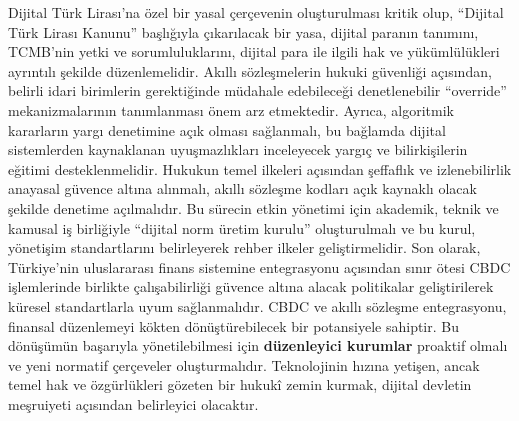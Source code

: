 \documentclass[a4paper,12pt]{article}
\begin{document}
Dijital Türk Lirası’na özel bir yasal çerçevenin oluşturulması kritik olup, “Dijital Türk Lirası Kanunu” başlığıyla çıkarılacak bir yasa, dijital paranın tanımını, TCMB’nin yetki ve sorumluluklarını, dijital para ile ilgili hak ve yükümlülükleri ayrıntılı şekilde düzenlemelidir. Akıllı sözleşmelerin hukuki güvenliği açısından, belirli idari birimlerin gerektiğinde müdahale edebileceği denetlenebilir “override” mekanizmalarının tanımlanması önem arz etmektedir. Ayrıca, algoritmik kararların yargı denetimine açık olması sağlanmalı, bu bağlamda dijital sistemlerden kaynaklanan uyuşmazlıkları inceleyecek yargıç ve bilirkişilerin eğitimi desteklenmelidir. Hukukun temel ilkeleri açısından şeffaflık ve izlenebilirlik anayasal güvence altına alınmalı, akıllı sözleşme kodları açık kaynaklı olacak şekilde denetime açılmalıdır. Bu sürecin etkin yönetimi için akademik, teknik ve kamusal iş birliğiyle “dijital norm üretim kurulu” oluşturulmalı ve bu kurul, yönetişim standartlarını belirleyerek rehber ilkeler geliştirmelidir. Son olarak, Türkiye’nin uluslararası finans sistemine entegrasyonu açısından sınır ötesi CBDC işlemlerinde birlikte çalışabilirliği güvence altına alacak politikalar geliştirilerek küresel standartlarla uyum sağlanmalıdır. CBDC ve akıllı sözleşme entegrasyonu, finansal düzenlemeyi kökten dönüştürebilecek bir potansiyele sahiptir. Bu dönüşümün başarıyla yönetilebilmesi için \textbf{düzenleyici kurumlar} proaktif olmalı ve yeni normatif çerçeveler oluşturmalıdır. Teknolojinin hızına yetişen, ancak temel hak ve özgürlükleri gözeten bir hukukî zemin kurmak, dijital devletin meşruiyeti açısından belirleyici olacaktır.



\printbibliography
\end{document}
